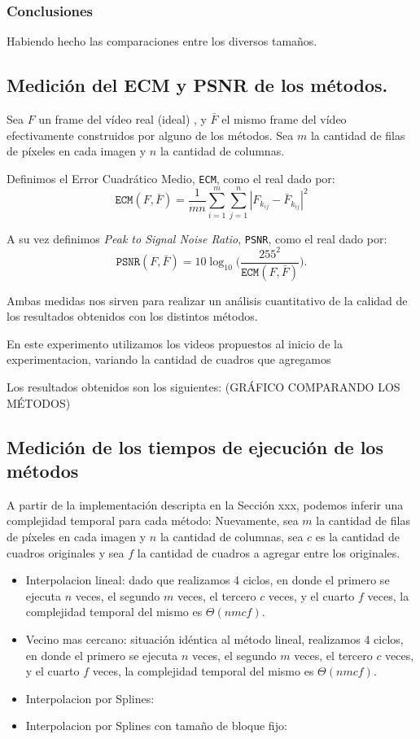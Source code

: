 \subsubsection{Conclusiones}

Habiendo hecho las comparaciones entre los diversos tamaños.

\subsection{Medición del ECM y PSNR de los métodos.}\label{ECM}
Sea $F$ un frame del vídeo real (ideal) , y $\bar{F}$ el mismo frame del vídeo efectivamente construidos por alguno de los métodos. Sea $m$ la cantidad de filas de píxeles en cada imagen y $n$ la cantidad de columnas.

Definimos el Error Cuadrático Medio, \texttt{ECM}, como el real dado por:
\begin{equation}
\texttt{ECM}(F,\bar{F}) = \frac{1}{mn}\sum_{i=1}^m\sum_{j = 1}^n |F_{k_{ij}} - \bar{F}_{k_{ij}}|^2
\end{equation}

A su vez definimos \emph{Peak to Signal Noise Ratio}, \texttt{PSNR}, como el real dado por:
\begin{equation}
\texttt{PSNR}(F,\bar{F}) = 10 \log_{10}\bigg(\frac{255^2}{\texttt{ECM}(F,\bar{F})}\bigg). \label{eq:psnr}
\end{equation}

Ambas medidas nos sirven para realizar un análisis cuantitativo de la calidad de los resultados obtenidos con los distintos métodos.

En este experimento utilizamos los videos propuestos al inicio de la experimentacion, variando la cantidad de cuadros que agregamos


Los resultados obtenidos son los siguientes: (GRÁFICO COMPARANDO LOS MÉTODOS)

\subsection{Medición de los tiempos de ejecución de los métodos}
A partir de la implementación descripta en la Sección xxx, podemos inferir una complejidad temporal para cada método:
Nuevamente, sea $m$ la cantidad de filas de píxeles en cada imagen y $n$ la cantidad de columnas, sea $c$ es la cantidad de cuadros originales y sea $f$ la cantidad de cuadros a agregar entre los originales.
\begin{itemize}
  \item Interpolacion lineal: dado que realizamos 4 ciclos, en donde el primero se ejecuta $n$ veces, el segundo $m$ veces, el tercero $c$ veces, y el cuarto $f$ veces, la complejidad temporal del mismo es $\Theta(nmcf)$.
  \item Vecino mas cercano: situación idéntica al método lineal, realizamos 4 ciclos, en donde el primero se ejecuta $n$ veces, el segundo $m$ veces, el tercero $c$ veces, y el cuarto $f$ veces, la complejidad temporal del mismo es $\Theta(nmcf)$.
  \item Interpolacion por Splines:
  \item Interpolacion por Splines con tamaño de bloque fijo:
\end{itemize}

